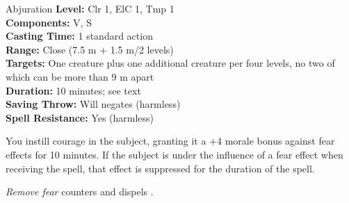 {Abjuration}
{
	\textbf{Level:}
	Clr 1, ElC 1, Tmp 1\\
	\textbf{Components:}
	V, S\\
	\textbf{Casting Time:}
	1 standard action\\
	\textbf{Range:}
	Close (7.5 m + 1.5 m/2 levels)\\
	\textbf{Targets:}
	One creature plus one additional creature per four levels, no two of which can be more than 9 m apart\\
	\textbf{Duration:}
	10 minutes; see text\\
	\textbf{Saving Throw:}
	Will negates (harmless)\\
	\textbf{Spell Resistance:}
	Yes (harmless)\\
}
{
	You instill courage in the subject, granting it a +4 morale bonus against fear effects for 10 minutes. If the subject is under the influence of a fear effect when receiving the spell, that effect is suppressed for the duration of the spell.

	\emph{Remove fear} counters and dispels .

}
